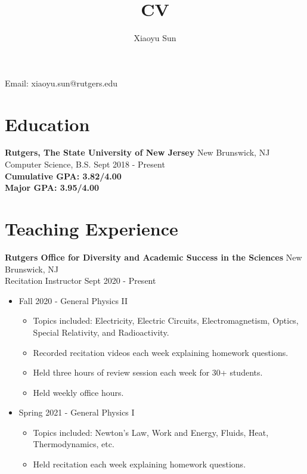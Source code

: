 \documentclass{article}
\makeatletter
\renewcommand{\maketitle}{
\begin{center}
{\huge\bfseries
\theauthor}

\vspace{.25em}

Email: xiaoyu.sun@rutgers.edu\\
\end{center}
}
\makeatother
\begin{document}
\title{CV}
\author{Xiaoyu Sun}
\maketitle

\section{Education}
\textbf{Rutgers, The State University of New Jersey} \space 
\hfill{New Brunswick, NJ}\\
Computer Science, B.S. \space
\hfill{Sept 2018 - Present}\\
\textbf{Cumulative GPA: 3.82/4.00}\\
\textbf{Major GPA: 3.95/4.00}


\section{Teaching Experience}
\textbf{Rutgers Office for Diversity and Academic Success in the Sciences}
\hfill{New Brunswick, NJ}\\
Recitation Instructor
\hfill{Sept 2020 - Present}
\begin{itemize}
  \item Fall 2020 - General Physics II
  \begin{itemize}
  	\item Topics included: Electricity, Electric Circuits, Electromagnetism, Optics, Special Relativity, and Radioactivity.
     \item Recorded recitation videos each week explaining homework questions.
     \item Held three hours of review session each week for 30+ students.
 	 \item Held weekly office hours.
  \end{itemize}
\end{itemize}
\begin{itemize}
  \item Spring 2021 - General Physics I
  \begin{itemize}
  	\item Topics included: Newton's Law,  Work and Energy,  Fluids,  Heat,  Thermodynamics,  etc.
     \item Held  recitation each week explaining homework questions.
  \end{itemize}
\end{itemize}
\end{document}
